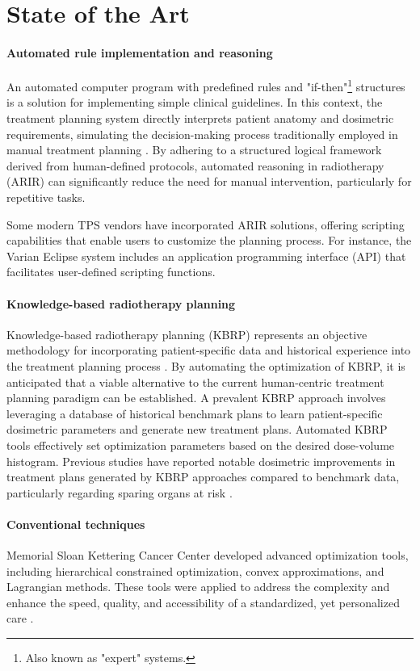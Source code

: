 \section{State of the Art}
\paragraph{Automated rule implementation and reasoning}
An automated computer program with predefined rules and "if-then"\footnote{Also known as "expert" systems.} structures is a solution for implementing simple clinical guidelines.
In this context, the treatment planning system directly interprets patient anatomy and dosimetric requirements, simulating the decision-making process traditionally employed in manual treatment planning \cite{Rossille2005}.
By adhering to a structured logical framework derived from human-defined protocols, automated reasoning in radiotherapy (ARIR) can significantly reduce the need for manual intervention, particularly for repetitive tasks.

Some modern TPS vendors have incorporated ARIR solutions, offering scripting capabilities that enable users to customize the planning process.
For instance, the Varian Eclipse \cite{eclipse} system includes an application programming interface (API) that facilitates user-defined scripting functions.

\paragraph{Knowledge-based radiotherapy planning}
Knowledge-based radiotherapy planning (KBRP) represents an objective methodology for incorporating patient-specific data and historical experience into the treatment planning process \cite{Nwankwo_2014}.
By automating the optimization of KBRP, it is anticipated that a viable alternative to the current human-centric treatment planning paradigm can be established.
A prevalent KBRP approach involves leveraging a database of historical benchmark plans to learn patient-specific dosimetric parameters and generate new treatment plans.
Automated KBRP tools effectively set optimization parameters based on the desired dose-volume histogram.
Previous studies have reported notable dosimetric improvements in treatment plans generated by KBRP approaches compared to benchmark data, particularly regarding sparing organs at risk \cite{Fogliata2014,Tol2015}.

\paragraph{Conventional techniques}
Memorial Sloan Kettering Cancer Center developed advanced optimization tools, including hierarchical constrained optimization, convex approximations, and Lagrangian methods.
These tools were applied to address the complexity and enhance the speed, quality, and accessibility of a standardized, yet personalized care \cite{Zarepisheh2022}.

